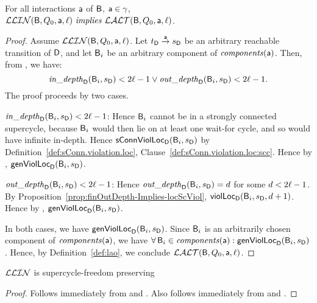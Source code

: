 \begin{lemma}
\label{lem:locLinear-implies-locANDOR}
\label{lemma:locLinear-implies-locANDOR}
\label{LLinLAO}
For all interactions $\act$ of $\B$, \ie $\act \in \gamma$, \\
\ind $\LLin(\B, Q_0, \act, \l)\ \impliess\ \LAO(\B, Q_0, \act, \l)$.
\end{lemma}
%
\begin{proof}
Assume $\LLin(\B, Q_0, \act, \l)$. Let $\tD \goesto[\act] \sD$ be an arbitrary reachable transition of $\dsk{\act}{\l}$,
and let $\B_i$ be an arbitrary component of $\cmps{\act}$.
Then, from , we have:
  $$\widepth{\dsk{\act}{\l}}{\B_i}{\sD} < 2\l-1 \lor \wodepth{\dsk{\act}{\l}}{\B_i}{\sD} < 2\l-1.$$
The proof proceeds by two cases. 

\vspace{1.0ex}
\ul{ $\widepth{\dsk{\act}{\l}}{\B_i}{\sD} < 2\l-1$}:
Hence $\B_i$ cannot be in a strongly connected supercycle, because $\B_i$ would then lie on at least one wait-for cycle, and so would have infinite
in-depth. Hence $\locConnViol{\B_i}{\sD}{\act}{\l}$ by Definition~\ref{def:sConn.violation.loc}, Clause~\ref{def:sConn.violation.loc:scc}.
Hence by , $\locFormViol{\B_i}{\sD}{\act}{\l}$.

\vspace{1.0ex}
\ul{$\wodepth{\dsk{\act}{\l}}{\B_i}{\sD} < 2\l-1$}:
Hence $\wodepth{\dsk{\act}{\l}}{\B_i}{\sD} = d$ for some $d < 2\l-1$.
By Proposition~\ref{prop:finOutDepth-Implies-locScViol}, $\locScViol{\B_i}{d+1}{\sD}{\act}{\l}$.
Hence by , $\locFormViol{\B_i}{\sD}{\act}{\l}$.

\vspace{1.0ex}
\noindent
In both cases, we have $\locFormViol{\B_i}{\sD}{\act}{\l}$.
Since $\B_i$ is an arbitrarily chosen  component of $\cmps{\act}$, we have $\fa \B_i \in \cmps{\act} : \locFormViol{\B_i}{\sD}{\act}{\l}$.
Hence, by Definition~\ref{def:lao}, we conclude $\LAO(\B, Q_0, \act, \l)$.
\end{proof}



\begin{theorem} \label{thm:LLin.SC-free-preserving}
$\LLin$ is supercycle-freedom preserving
\end{theorem}
%
\begin{proof}
Follows immediately from  and .
%
Also follows immediately from  and .
\end{proof}
